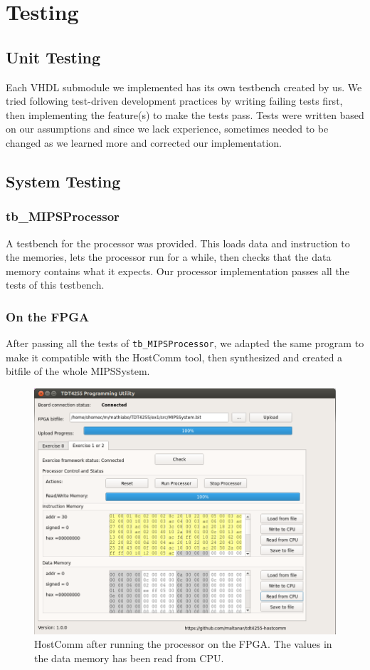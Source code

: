 \section{Testing}
\subsection{Unit Testing}
Each VHDL submodule we implemented has its own testbench created by us.
We tried following test-driven development practices by writing failing tests first, then implementing the feature(s) to make the tests pass.
Tests were written based on our assumptions and since we lack experience,
sometimes needed to be changed as we learned more and corrected our implementation.

\subsection{System Testing}
\subsubsection{tb\_MIPSProcessor}
A testbench for the processor was provided.
This loads data and instruction to the memories,
lets the processor run for a while,
then checks that the data memory contains what it expects.
Our processor implementation passes all the tests of this testbench.

\subsubsection{On the FPGA}
After passing all the tests of \texttt{tb\_MIPSProcessor},
we adapted the same program to make it compatible with the HostComm tool,
then synthesized and created a bitfile of the whole MIPSSystem.

\begin{figure}[h]
    \centering
    \includegraphics[width=\textwidth]{img/Hostcomm}
    \caption{HostComm after running the processor on the FPGA. The values in the data memory has been read from CPU.}
    \label{fig:hostcomm}
\end{figure}
